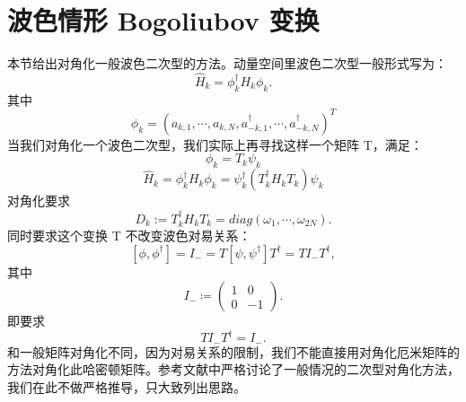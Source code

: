 \documentclass[UTF8]{ctexart}
\begin{document}
\section*{波色情形 Bogoliubov 变换}
\noindent
本节给出对角化一般波色二次型的方法。动量空间里波色二次型一般形式写为：
\begin{equation}
\hat{H}_{k}=\phi_{k}^{\dagger}H_{k}\phi_{k}.
\end{equation}
其中
\begin{equation}
\phi_{k}=\left(a_{k,1},\cdots,a_{k,N},a_{-k,1}^{\dagger},\cdots,a_{-k,N}^{\dagger}\right)^{T}
\end{equation}
当我们对角化一个波色二次型，我们实际上再寻找这样一个矩阵 T，满足：
\begin{equation}
\phi_{k}=T_{k}\psi_{k}
\end{equation}
\begin{equation}
\hat{H}_{k}=\phi_{k}^{\dagger}H_{k}\phi_{k}=\psi_{k}^{\dagger}\left(T_{k}^{\dagger}H_{k}T_{k}\right)\psi_{k}
\end{equation}
对角化要求
\begin{equation}
D_{k}:=T_{k}^{\dagger}H_{k}T_{k}=diag\left(\omega_{1},\cdots,\omega_{2N}\right).
\end{equation}
同时要求这个变换 T 不改变波色对易关系：
\begin{equation}
\left[\phi,\phi^{\dagger}\right]=I_{-}=T\left[\psi,\psi^{\dagger}\right]T^{\dagger}=TI_{-}T^{\dagger},
\end{equation}
其中
\begin{equation}
I_{-}\coloneqq\left(\begin{array}{cc}
1 & 0\\
0 & -1
\end{array}\right).
\end{equation}
即要求
\begin{equation}
TI_{-}T^{\dagger}=I_{-}.
\end{equation}
和一般矩阵对角化不同，因为对易关系的限制，我们不能直接用对角化厄米矩阵的方法对角化此哈密顿矩阵。参考文献中严格讨论了一般情况的二次型对角化方法，我们在此不做严格推导，只大致列出思路。
\end{document}
